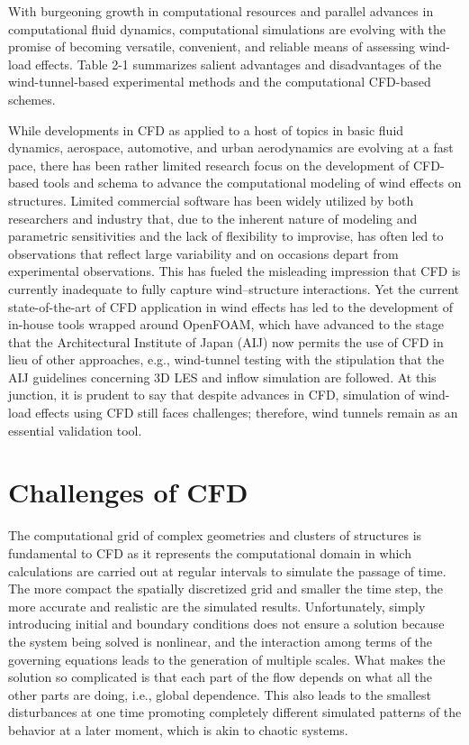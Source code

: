 With burgeoning growth in computational resources and parallel advances in computational fluid dynamics, computational simulations are evolving with the promise of becoming versatile, convenient, and reliable means of assessing wind-load effects. Table 2-1 summarizes salient advantages and disadvantages of the wind-tunnel-based experimental methods and the computational CFD-based schemes.

While developments in CFD as applied to a host of topics in basic fluid dynamics, aerospace, automotive, and urban aerodynamics are evolving at a fast pace, there has been rather limited research focus on the development of CFD-based tools and schema to advance the computational modeling of wind effects on structures. Limited commercial software has been widely utilized by both researchers and industry that, due to the inherent nature of modeling and parametric sensitivities and the lack of flexibility to improvise, has often led to observations that reflect large variability and on occasions depart from experimental observations. This has fueled the misleading impression that CFD is currently inadequate to fully capture wind–structure interactions. Yet the current state-of-the-art of CFD application in wind effects has led to the development of in-house tools wrapped around OpenFOAM, which have advanced to the stage that the Architectural Institute of Japan (AIJ) now permits the use of CFD in lieu of other approaches, e.g., wind-tunnel testing with the stipulation that the AIJ guidelines concerning 3D LES and inflow simulation are followed. At this junction, it is prudent to say that despite advances in CFD, simulation of wind-load effects using CFD still faces challenges; therefore, wind tunnels remain as an essential validation tool.
 
\section{Challenges of CFD}
\label{sec:resp_cfd_wind_challenges}

The computational grid of complex geometries and clusters of structures is fundamental to CFD as it represents the computational domain in which calculations are carried out at regular intervals to simulate the passage of time. The more compact the spatially discretized grid and smaller the time step, the more accurate and realistic are the simulated results. Unfortunately, simply introducing initial and boundary conditions does not ensure a solution because the system being solved is nonlinear, and the interaction among terms of the governing equations leads to the generation of multiple scales. What makes the solution so complicated is that each part of the flow depends on what all the other parts are doing, i.e., global dependence. This also leads to the smallest disturbances at one time promoting completely different simulated patterns of the behavior at a later moment, which is akin to chaotic systems.

